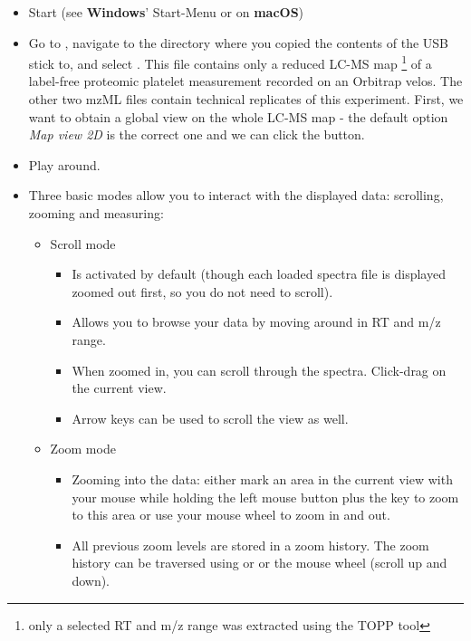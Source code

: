 \begin{itemize}
\item Start  (see \textbf{Windows}' Start-Menu or  on \textbf{macOS})
\item Go to , navigate to the directory where you copied the contents of the USB stick to,
      and select
      . This file contains only a reduced LC-MS map \footnote{only a selected RT and m/z range
      was extracted using the TOPP tool } of a label-free proteomic platelet measurement recorded on an Orbitrap velos.
      The other two mzML files contain technical replicates of this experiment.
      First, we want to obtain a global view on the whole LC-MS map - the default option \textit{Map view 2D} is the correct one and we can click the  button. 
\item Play around.
\item Three basic modes allow you to interact with the displayed data: scrolling, zooming and measuring:
    \begin{itemize}
    \item Scroll mode
        \begin{itemize}
        \item Is activated by default (though each loaded spectra file is displayed zoomed out first, so you do not need to scroll).
        \item Allows you to browse your data by moving around in RT and m/z range.
        \item When zoomed in, you can scroll through the spectra. Click-drag on the current view.
        \item Arrow keys can be used to scroll the view as well.
        \end{itemize}
    \item Zoom mode
        \begin{itemize}
        \item Zooming into the data: either mark an area in the current view with your mouse while holding the left mouse
              button plus the \keys{\ctrlwin} key to zoom to this area
              or use your mouse wheel to zoom in and out.
        \item All previous zoom levels are stored in a zoom history. The zoom history can be traversed using
              \keys[,]{\ctrlwin,+} or \keys[,]{\ctrlwin,-} or the mouse wheel (scroll up and down).

\end{itemize}
\end{itemize}
\end{itemize}
